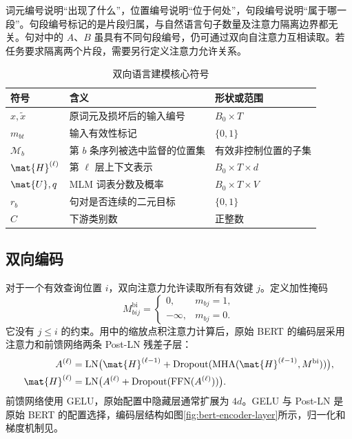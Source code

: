 \documentclass[../textbook.tex]{subfiles}
\begin{document}
词元编号说明“出现了什么”，位置编号说明“位于何处”，句段编号说明“属于哪一段”。句段编号标记的是片段归属，与自然语言句子数量及注意力隔离边界都无关。句对中的 $A$、$B$ 虽具有不同句段编号，仍可通过双向自注意力互相读取。若任务要求隔离两个片段，需要另行定义注意力允许关系。

\begin{table}[htbp]
\centering
\caption{双向语言建模核心符号}\label{tab:mlm-symbols}
\begin{tabularx}{\linewidth}{lXl}
\toprule 符号 & 含义 & 形状或范围\\\midrule
$x,\widetilde x$ & 原词元及损坏后的输入编号 & $B_0\times T$\\
$m_{bt}$ & 输入有效性标记 & $\{0,1\}$\\
$\mathcal M_b$ & 第 $b$ 条序列被选中监督的位置集 & 有效非控制位置的子集\\
$\mat{H}^{(\ell)}$ & 第 $\ell$ 层上下文表示 & $B_0\times T\times d$\\
$\mat{U},q$ & MLM 词表分数及概率 & $B_0\times T\times V$\\
$r_b$ & 句对是否连续的二元目标 & $\{0,1\}$\\
$C$ & 下游类别数 & 正整数\\
\bottomrule
\end{tabularx}
\end{table}

\subsection{双向编码}
对于一个有效查询位置 $i$，双向注意力允许读取所有有效键 $j$。定义加性掩码
\begin{equation}
 M^{\mathrm{bi}}_{bij}=\begin{cases}0,&m_{bj}=1,\\-\infty,&m_{bj}=0.\end{cases}
\end{equation}
它没有 $j\le i$ 的约束。用中的缩放点积注意力计算后，原始 BERT 的编码层采用注意力和前馈网络两条 Post-LN 残差子层：
\begin{align}
 A^{(\ell)}&=\operatorname{LN}\bigl(\mat{H}^{(\ell-1)}+
 \operatorname{Dropout}(\operatorname{MHA}(\mat{H}^{(\ell-1)},M^{\mathrm{bi}}))\bigr),\\
 \mat{H}^{(\ell)}&=\operatorname{LN}\bigl(A^{(\ell)}+
 \operatorname{Dropout}(\operatorname{FFN}(A^{(\ell)}))\bigr).
\end{align}
前馈网络使用 GELU，原始配置中隐藏层通常扩展为 $4d$。GELU 与 Post-LN 是原始 BERT 的配置选择，编码层结构如图\ref{fig:bert-encoder-layer}所示，归一化和梯度机制见。
\end{document}
